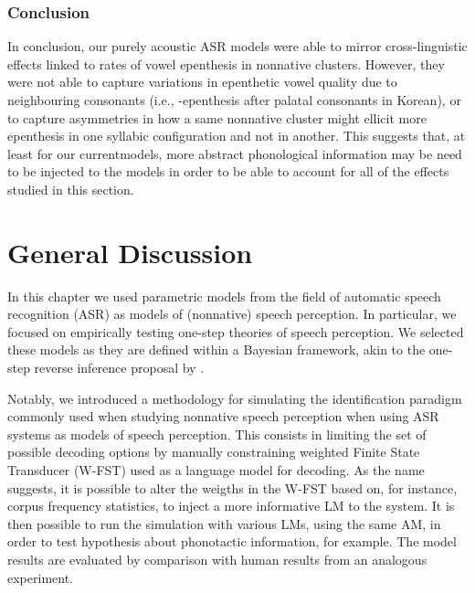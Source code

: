 {\subsubsection{Conclusion}
In conclusion, our purely acoustic ASR models were able to mirror cross-linguistic effects linked to rates of vowel epenthesis in nonnative clusters. However, they were not able to capture variations in epenthetic vowel quality due to neighbouring consonants (i.e., -epenthesis after palatal consonants in Korean), or to capture asymmetries in how a same nonnative cluster might ellicit more epenthesis in one syllabic configuration and not in another. This suggests that, at least for our currentmodels, more abstract phonological information may be need to be injected to the models in order to be able to account for all of the effects studied in this section.  


\newpage
\section{General Discussion}
In this chapter we used parametric models from the field of automatic speech recognition (ASR) as models of (nonnative) speech perception. In particular, we focused on empirically testing one-step theories of speech perception. We selected these models as they are defined within a Bayesian framework, akin to the one-step reverse inference proposal by \cite{wilson2013}.

Notably, we introduced a methodology for simulating the identification paradigm commonly used when studying nonnative speech perception when using ASR systems as models of speech perception. This consists in limiting the set of possible decoding options by manually constraining weighted Finite State Transducer (W-FST) used as a language model for decoding. As the name suggests, it is possible to alter the weigths in the W-FST based on, for instance, corpus frequency statistics, to inject a more informative LM to the system. It is then possible to run the simulation with various LMs, using the same AM, in order to test hypothesis about phonotactic information, for example.
The model results are evaluated by comparison with human results from an analogous experiment.

}
